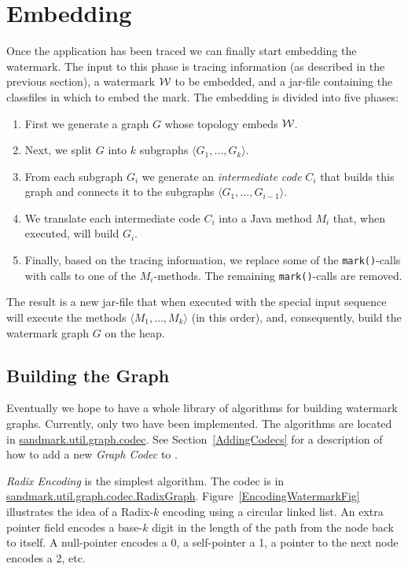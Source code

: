 \section{Embedding}
Once the application has been traced we can finally start
embedding the watermark. The input to this phase is 
tracing information (as described in the previous section),
a watermark $\cal W$ to be embedded, and a jar-file 
containing the classfiles in which to embed the mark. 
The embedding is divided into five phases:
\begin{enumerate}
   \item First we generate a graph $G$ whose topology embeds $\cal W$.
   \item Next, we split $G$ into $k$ subgraphs $\langle G_1,\ldots,G_k\rangle$.
   \item From each subgraph $G_i$ we generate an {\em intermediate
         code} $C_i$ that builds this graph and connects it to
         the subgraphs $\langle G_1,\ldots,G_{i-1}\rangle$.
   \item We translate each intermediate code $C_i$ into a Java method
         $M_i$ that, when executed, will build $G_i$.
   \item Finally, based on the tracing information, we replace some
         of the {\tt mark()}-calls with calls to one of the $M_i$-methods. 
         The remaining {\tt mark()}-calls are removed.
\end{enumerate}
The result is a new jar-file that when executed with the special
input sequence will execute the methods $\langle M_1,\ldots,M_k\rangle$ 
(in this order), and, consequently, build the watermark graph
$G$ on the heap.

\subsection{Building the Graph}
Eventually we hope to have a whole library of algorithms
for building watermark graphs. Currently, only two have
been implemented. The algorithms are located in 
\url{sandmark.util.graph.codec}. See Section~\ref{AddingCodecs} for
a description of how to add a new {\em Graph Codec} to
\SM. 

{\em Radix Encoding} is the simplest algorithm. The 
codec is in \url{sandmark.util.graph.codec.RadixGraph}.
Figure~\ref{EncodingWatermarkFig} illustrates the idea
of a Radix-$k$ encoding using a circular linked list. 
An extra pointer field encodes a base-$k$ digit in the 
length of the path from the node  back to itself. 
A null-pointer encodes a 0, a self-pointer a 1, a 
pointer to the next node encodes a 2, etc. 

